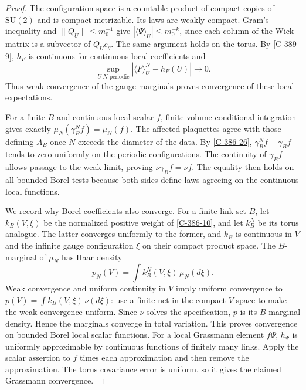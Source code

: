 \documentclass[11pt,letterpaper,reqno]{amsart}
\theoremstyle{definition}
\theoremstyle{remark}
\begin{document}
\begin{proof}
The configuration space is a countable product of compact copies
of $\mathrm{SU}(2)$ and is compact metrizable. Its laws are weakly
compact. Gram's inequality and $\|Q_U\|\le m_0^{-1}$ give
$|\langle\Psi\rangle_U|\le m_0^{-k}$, since each column of
the Wick matrix is a subvector of $Q_Ue_q$. The same argument
holds on the torus. By \cref{C-389-9}, $h_F$ is continuous for
continuous local coefficients and
\[
 \sup_{U\;N\text{-periodic}}|\langle F\rangle_U^N-h_F(U)|\longrightarrow0.
\]
Thus weak convergence of the gauge marginals proves convergence
of these local expectations.

For a finite $B$ and continuous local scalar $f$, finite-volume
conditional integration gives exactly
$\mu_N(\gamma_B^Nf)=\mu_N(f)$. The affected plaquettes agree
with those defining $A_B$ once $N$ exceeds the diameter of the
data. By \cref{C-386-26}, $\gamma_B^Nf-\gamma_Bf$ tends to
zero uniformly on the periodic configurations. The continuity of
$\gamma_Bf$ allows passage to the weak limit, proving
$\nu\gamma_Bf=\nu f$. The equality then holds on all bounded
Borel tests because both sides define laws agreeing on the
continuous local functions.

We record why Borel coefficients also converge. For a finite link
set $B$, let $k_B(V,\xi)$ be the normalized positive weight of
\eqref{C-386-10}, and let $k_B^N$ be its torus analogue.
The latter converges uniformly to the former, and $k_B$ is
continuous in $V$ and the infinite gauge configuration $\xi$
on their compact product space.
The $B$-marginal of $\mu_N$ has Haar density
\[
 p_N(V)=\int k_B^N(V,\xi)\,\mu_N(d\xi).
\]
Weak convergence and uniform continuity in $V$ imply uniform
convergence to $p(V)=\int k_B(V,\xi)\,\nu(d\xi)$:
use a finite net in the compact $V$ space to make the weak
convergence uniform. Since $\nu$ solves the specification, $p$
is its $B$-marginal density. Hence the marginals converge in
total variation. This proves convergence on bounded Borel local
scalar functions. For a local Grassmann element $f\Psi$,
$h_\Psi$ is uniformly approximable by continuous functions of
finitely many links. Apply the scalar assertion to $f$ times
each approximation and then remove the approximation. The
torus covariance error is uniform, so it gives the claimed
Grassmann convergence.


\end{proof}
\end{document}
